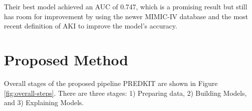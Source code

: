 \documentclass[sn-mathphys-num]{sn-jnl}%
\theoremstyle{thmstyleone}%
\theoremstyle{thmstyletwo}%
\theoremstyle{thmstylethree}%
\begin{document}



Their best model achieved an AUC of 0.747, which is a promising result but still has room for improvement by using the newer MIMIC-IV database and the most recent definition of AKI to improve the model's accuracy.



\section{Proposed Method}
\label{sec:proposal}




Overall stages of the proposed pipeline PREDKIT are shown in Figure \ref{fig:overall-steps}. There are three stages: 1) Preparing data, 2) Building Models, and 3) Explaining Models.
\end{document}
